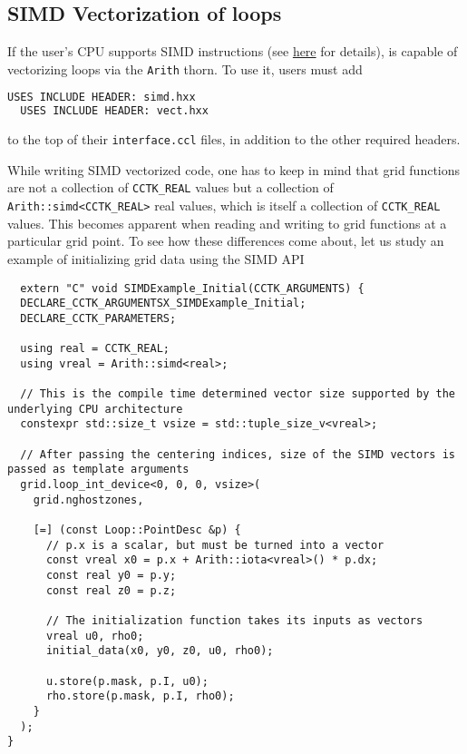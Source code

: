 \subsection{SIMD Vectorization of loops}

If the user's CPU supports SIMD instructions (see \href{https://en.wikipedia.org/wiki/Single_instruction,_multiple_data}{here} for details), \CarpetX\space is capable of vectorizing loops via the \texttt{Arith} thorn. To use it, users must add
%
\begin{lstlisting}[language=bash]
  USES INCLUDE HEADER: simd.hxx
  USES INCLUDE HEADER: vect.hxx
\end{lstlisting}
%
to the top of their \texttt{interface.ccl} files, in addition to the other required headers.

While writing SIMD vectorized code, one has to keep in mind that grid functions are not a collection of \texttt{CCTK\_REAL} values but a collection of \texttt{Arith::simd<CCTK\_REAL>} real values, which is itself a collection of \texttt{CCTK\_REAL} values. This becomes apparent when reading and writing to grid functions at a particular grid point. To see how these differences come about, let us study an example of initializing grid data using the SIMD API
%
\begin{lstlisting}
  extern "C" void SIMDExample_Initial(CCTK_ARGUMENTS) {
  DECLARE_CCTK_ARGUMENTSX_SIMDExample_Initial;
  DECLARE_CCTK_PARAMETERS;

  using real = CCTK_REAL;
  using vreal = Arith::simd<real>;
  
  // This is the compile time determined vector size supported by the underlying CPU architecture
  constexpr std::size_t vsize = std::tuple_size_v<vreal>;

  // After passing the centering indices, size of the SIMD vectors is passed as template arguments
  grid.loop_int_device<0, 0, 0, vsize>(
    grid.nghostzones,
    
    [=] (const Loop::PointDesc &p) {
      // p.x is a scalar, but must be turned into a vector
      const vreal x0 = p.x + Arith::iota<vreal>() * p.dx;
      const real y0 = p.y;
      const real z0 = p.z;
      
      // The initialization function takes its inputs as vectors
      vreal u0, rho0;
      initial_data(x0, y0, z0, u0, rho0);
      
      u.store(p.mask, p.I, u0);
      rho.store(p.mask, p.I, rho0);
    }
  );
}
\end{lstlisting}

